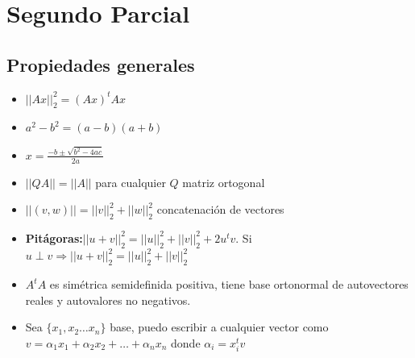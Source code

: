 \section*{Segundo Parcial}
\subsection*{Propiedades generales}
\begin{itemize}
    \item $||Ax||_2^2 = (Ax)^t Ax$
    \item $a^2-b^2 = (a-b) (a+b)$
    \item $x = \frac {-b \pm \sqrt {b^2 - 4ac}}{2a}$
    \item $||QA|| = ||A||$ para cualquier $Q$ matriz ortogonal
    \item $||(v,w)|| = ||v||_2^2+||w||_2^2$ concatenación de vectores
    \item \textbf{Pitágoras:}$ ||u+v||_2^2 = ||u||_2^2+||v||_2^2 + 2u^tv$. Si $u \perp v \Rightarrow ||u+v||_2^2 = ||u||_2^2+||v||_2^2$
    \item $A^tA$ es simétrica semidefinida positiva, tiene base ortonormal de autovectores reales y autovalores no negativos. 
    \item Sea $\{x_1, x_2 \dots x_n\}$ base, puedo escribir a cualquier vector como $v = \alpha_1 x_1 + \alpha_2 x_2 + \dots + \alpha_n x_n$ donde $\alpha_i = x_i^t v$
\end{itemize}
